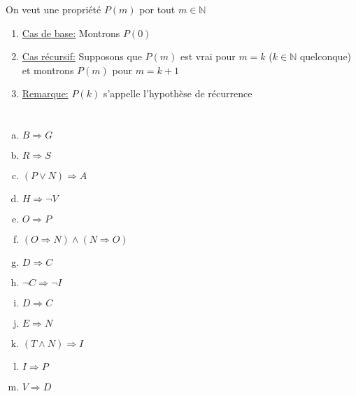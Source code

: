 \documentclass{report}
\begin{document}
 
  On veut une propri\'{e}t\'{e} $P(m)$ por tout $m \in \mathbb{N}$
  \newline
  
  \begin{enumerate}[\textperiodcentered]
  \item \underline{Cas de base:}
      \newline
      Montrons $P(0)$
   \item \underline{Cas r\'{e}cursif:}
      \newline
      Supposons que $P(m)$ est vrai pour $m=k$ ($k \in \mathbb{N}$ quelconque) et montrons $P(m)$ pour $m=k+1$
      \newline   
   \item \underline{Remarque:}
   \newline
   $P(k)$ s'appelle l'hypoth\`{e}se de r\'{e}currence

  \end{enumerate}
  
  \section{} %
    \begin{multicols}{4}
      \begin{enumerate}[a.]
	\item $B \Rightarrow G$
	\item $R \Rightarrow S$
	\item $(P \vee N) \Rightarrow A$
	\item $H \Rightarrow \neg V$
	\item $O \Rightarrow P$
	\item $(O \Rightarrow N) \wedge (N \Rightarrow O)$
	\item $D \Rightarrow C$
	\item $\neg C \Rightarrow \neg I$
	\item $D \Rightarrow C$
	\item $E \Rightarrow N$
	\item $(T \wedge N) \Rightarrow I$
	\item $I \Rightarrow P$
	\item $V \Rightarrow D$
      \end{enumerate}
    \end{multicols}

    
  \section{} %
\end{document}
